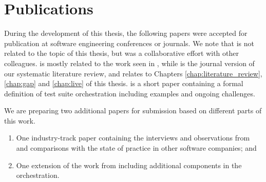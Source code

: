 %

\section{Publications}\label{sec:publications}

\begin{refsection}[P]
During the development of this thesis, the following papers were accepted for publication at software engineering conferences or journals.
We note that \cite{rossi2020defensive_p} is not related to the topic of this thesis, but was a collaborative effort with other colleagues.
\cite{greca_comparing_2022_p} is mostly related to the work seen in , while \cite{greca_live_2022_p} is the journal version of our systematic literature review, and relates to Chapters \ref{chap:literature_review}, \ref{chap:gap} and \ref{chap:live} of this thesis.
\cite{greca_orchestration_2023_p} is a short paper containing a formal definition of test suite orchestration including examples and ongoing challenges.

	\newrefcontext[labelprefix=P]
	\nocite{*}
    \printbibliography[heading=P]

We are preparing two additional papers for submission based on different parts of this work.

\begin{enumerate}
	\item One industry-track paper containing the interviews and observations from  and comparisons with the state of practice in other software companies; and
	\item One extension of the work from  including additional components in the orchestration.
\end{enumerate}
   
\end{refsection}





%

